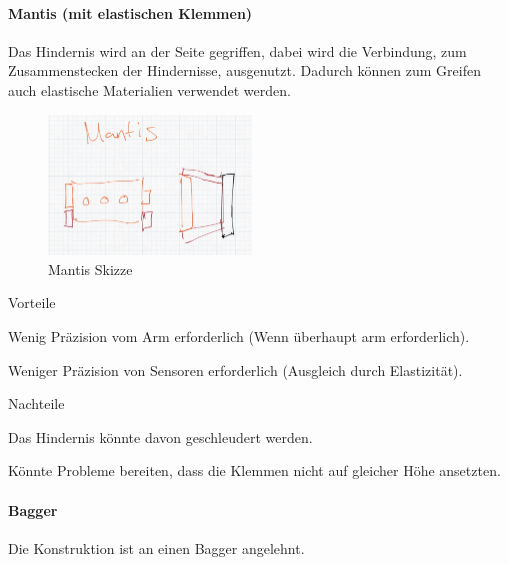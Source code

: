 \documentclass[../main.tex]{subfiles}
\begin{document}
\paragraph{Mantis (mit elastischen Klemmen)}
Das Hindernis wird an der Seite gegriffen, dabei wird die Verbindung, zum Zusammenstecken der Hindernisse, ausgenutzt. Dadurch können zum Greifen auch elastische Materialien verwendet werden.

\begin{figure}[h!]
        \centering
        \includegraphics[width=0.48\textwidth]{img/technologierecherche/Aufnahme/Mantis.jpg}
        \caption{Mantis Skizze}
        \label{img:tech_Mantis}
\end{figure}

\begin{minipage}[t]{0.48\textwidth}
    \begin{items}
          \item [Vorteile]
          \item Wenig Präzision vom Arm erforderlich (Wenn überhaupt arm erforderlich).
          \item Weniger Präzision von Sensoren erforderlich (Ausgleich durch Elastizität).
    \end{items}
\end{minipage}
\hfill
\begin{minipage}[t]{0.48\textwidth}
    \begin{items}
          \item [Nachteile]
          \item Das Hindernis könnte davon geschleudert werden.
          \item Könnte Probleme bereiten, dass die Klemmen nicht auf gleicher Höhe ansetzten.
    \end{items}
\end{minipage}
\newpage

\paragraph{Bagger}
Die Konstruktion ist an einen Bagger angelehnt.
\end{document}
